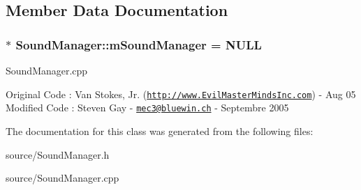 \subsection{Member Data Documentation}
\hypertarget{class_sound_manager_ac5f215ad5ed295dcd15ebed201857d1e}{
\subsubsection[{m\-Sound\-Manager}]{ $\ast$ Sound\-Manager\-::m\-Sound\-Manager = N\-U\-L\-L\hspace{0.3cm}{\ttfamily [static]}}}\label{class_sound_manager_ac5f215ad5ed295dcd15ebed201857d1e}
Sound\-Manager.\-cpp

Original Code \-: Van Stokes, Jr. (\href{http://www.EvilMasterMindsInc.com}{\tt http\-://www.\-Evil\-Master\-Minds\-Inc.\-com}) -\/ Aug 05 Modified Code \-: Steven Gay -\/ \href{mailto:mec3@bluewin.ch}{\tt mec3@bluewin.\-ch} -\/ Septembre 2005 

The documentation for this class was generated from the following files\-:\begin{DoxyCompactItemize}
\item 
source/Sound\-Manager.\-h\item 
source/Sound\-Manager.\-cpp\end{DoxyCompactItemize}
